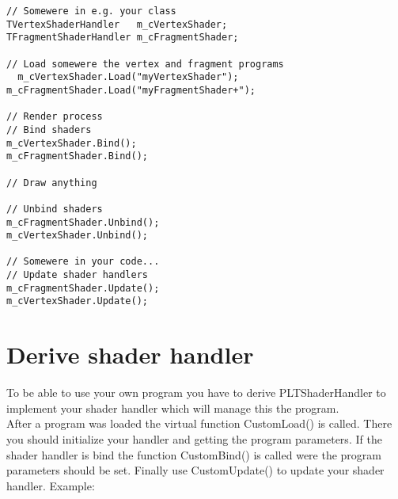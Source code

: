 \begin{lstlisting}[caption=Using shader handler]
// Somewere in e.g. your class
TVertexShaderHandler   m_cVertexShader;
TFragmentShaderHandler m_cFragmentShader;

// Load somewere the vertex and fragment programs
  m_cVertexShader.Load("myVertexShader");
m_cFragmentShader.Load("myFragmentShader+");

// Render process
// Bind shaders
m_cVertexShader.Bind();
m_cFragmentShader.Bind();

// Draw anything

// Unbind shaders
m_cFragmentShader.Unbind();
m_cVertexShader.Unbind();

// Somewere in your code...
// Update shader handlers
m_cFragmentShader.Update();
m_cVertexShader.Update();
\end{lstlisting}




\section{Derive shader handler}
To be able to use your own program you have to derive PLTShaderHandler to implement your shader
handler which will manage this the program.\\
After a program was loaded the virtual function CustomLoad() is called. There you should initialize
your handler and getting the program parameters. If the shader handler is bind the function CustomBind()
is called were the program parameters should be set. Finally use CustomUpdate() to update your shader
handler. Example:\\


